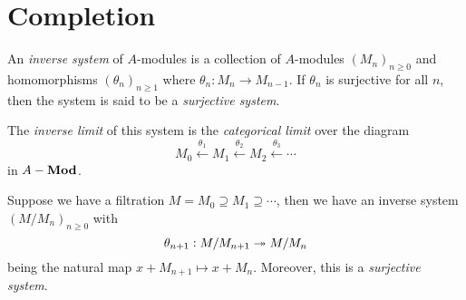 \section{Completion}

\begin{definition}
    An \emph{inverse system} of $A$-modules is a collection of $A$-modules $(M_n)_{n\ge 0}$ and homomorphisms $(\theta_n)_{n\ge 1}$ where $\theta_n: M_n\to M_{n - 1}$. If $\theta_n$ is surjective for all $n$, then the system is said to be a \emph{surjective system}.

    The \emph{inverse limit} of this system is the \emph{categorical limit} over the diagram 
    \begin{equation*}
        M_0\stackrel{\theta_1}{\longleftarrow} M_1\stackrel{\theta_2}{\longleftarrow} M_2\stackrel{\theta_3}{\longleftarrow}\cdots
    \end{equation*}
    in $A-\mathbf{Mod}$.
\end{definition}

\begin{example}
    Suppose we have a filtration $M = M_0\supseteq M_1\supseteq\cdots$, then we have an inverse system $(M/M_n)_{n\ge 0}$ with 
    \begin{equation*}
        \theta_{n + 1}: M/M_{n + 1}\twoheadrightarrow M/M_n
    \end{equation*}
    being the natural map $x + M_{n + 1}\mapsto x + M_n$. Moreover, this is a \emph{surjective system}.
\end{example}

